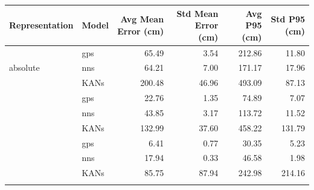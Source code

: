 
\begin{tabular}{llrrrr}
\toprule
Representation & Model & Avg Mean Error (cm) & Std Mean Error (cm) & Avg P95 (cm) & Std P95 (cm) \\
\midrule

\multirow{3}{*}{absolute} & gps & 65.49 & 3.54 & 212.86 & 11.80 \\
 & nns & 64.21 & 7.00 & 171.17 & 17.96 \\
 & KANs & 200.48 & 46.96 & 493.09 & 87.13 \\
\addlinespace
\multirow{3}{*}{relative} & gps & 22.76 & 1.35 & 74.89 & 7.07 \\
 & nns & 43.85 & 3.17 & 113.72 & 11.52 \\
 & KANs & 132.99 & 37.60 & 458.22 & 131.79 \\
\addlinespace
\multirow{3}{*}{log_d} & gps & 6.41 & 0.77 & 30.35 & 5.23 \\
 & nns & 17.94 & 0.33 & 46.58 & 1.98 \\
 & KANs & 85.75 & 87.94 & 242.98 & 214.16 \\
\addlinespace

\bottomrule
\end{tabular}
